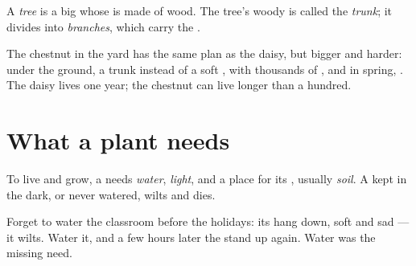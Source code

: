 \begin{definition}[Tree]\label{def:g1:plants-around-us:tree}
A \emph{tree} is a big  whose  is made of
wood. The tree's woody  is called the \emph{trunk};
it divides into \emph{branches}, which carry the
.
\end{definition}

\begin{example}\label{ex:g1:plants-around-us:tree}
The chestnut  in the yard has the same plan as the daisy, but
bigger and harder:  under the ground, a trunk instead of a
soft ,  with thousands of , and in spring,
. The daisy lives one year; the chestnut can live longer
than a hundred.
\end{example}

\section{What a plant needs}

\begin{proposition}\label{prop:g1:plants-around-us:needs}
To live and grow, a  needs \emph{water}, \emph{light}, and a
place for its , usually \emph{soil}. A  kept
in the dark, or never watered, wilts and dies.
\end{proposition}
\admitted

\begin{example}\label{ex:g1:plants-around-us:wilt}
Forget to water the classroom  before the holidays: its 
hang down, soft and sad --- it wilts. Water it, and a few hours
later the  stand up again. Water was the missing need.
\end{example}

